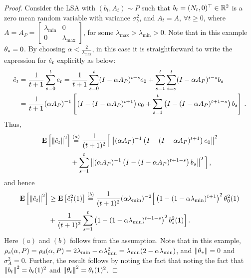 \begin{proof}
Consider the LSA with $(b_t,A_t)\sim P$ such that $b_t=(N_t,0)^\top\in\mathbb{R}^2$ is a zero mean \iid random variable with variance $\sigma^2_b$, and $A_t=A,\,\forall t\geq 0$, where $A=A_P=\begin{bmatrix} \lambda_{\min} &0\\ 0& \lambda_{\max}\end{bmatrix}$, for some $\lambda_{\max}>\lambda_{\min}>0$. Note that in this example $\theta_*=0$.
By choosing $\alpha<\frac2{\lambda_{\max}}$, in this case it is straightforward to write the expression for $\hat{e}_t$ explicitly as below:
\begin{align*}
\hat{e}_t&=\frac{1}{t+1}\sum_{s=0}^t e_t = \frac{1}{t+1}\sum_{s=0}^t (I-\alpha A_P)^{t-s} e_0 + \sum_{s=1}^t \sum_{i=s}^t (I-\alpha A_P)^{i-s} b_s\\
&=\frac{1}{t+1}(\alpha A_P)^{-1}\left[\left(I-(I-\alpha A_P)^{t+1}\right)e_0 + \sum_{s=1}^t \left(I-(I-\alpha A_P)^{t+1-s}\right) b_s\right]\,.
\end{align*}
Thus,
\begin{align*}
\mathbf{E}\left[\left\| \hat{e}_t\right\|^2\right]&\stackrel{(a)}{=}\frac{1}{(t+1)^2}\Big[\left\| (\alpha A_P)^{-1}\left(I-(I-\alpha A_P)^{t+1}\right)e_0\right\|^2 \\ 
&+\sum_{s=1}^t \left\| (\alpha A_P)^{-1}\left(I-(I-\alpha A_P)^{t+1-s}\right)b_s\right\|^2\Big]\,,
\end{align*}
and hence
\begin{align*}
\mathbf{E}\left[\left\| \hat{e}_t\right\|^2\right]
& \geq \mathbf{E}\left[\hat{e}^2_t(1)\right]\stackrel{(b)}{=}\frac{1}{(t+1)^2}(\alpha \lambda_{\min})^{-2}\Big[\left(1-(1-\alpha \lambda_{\min})^{t+1}\right)^2 \theta^2_0(1)\\
& + \frac{1}{(t+1)^2}\sum_{s=1}^t\left(1-(1-\alpha \lambda_{\min})^{t+1-s}\right)^2 b^2_s(1) \Big]\,.
\end{align*}
Here $(a)$ and $(b)$ follows from the \iid assumption. Note that in this example, $\rho_s(\alpha,P)=\rho_d(\alpha,P)=2\lambda_{\min} -\alpha \lambda_{\min}^2=\lambda_{\min}(2-\alpha \lambda_{\min})$, and $\left\| \theta_*\right\|=0$ and $\sigma^2_A=0$. Further, the result follows by noting the fact that noting the fact that $\left\| b_t\right\|^2=b_t(1)^2$ and $\left\| \theta_t\right\|^2=\theta_t(1)^2$.
\end{proof}
